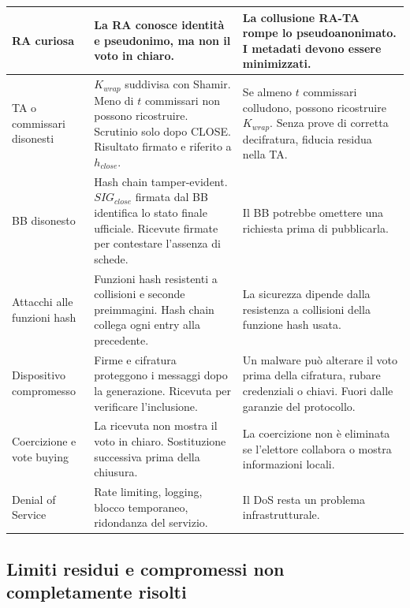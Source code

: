 \documentclass[12pt,a4paper]{article}
\begin{document}
\begin{small}
\begin{longtable}{>{\raggedright}p{2.8cm} p{4.8cm} p{5.2cm}}
RA curiosa &
La RA conosce identit\`a e pseudonimo, ma non il voto in chiaro. &
La collusione RA-TA rompe lo pseudoanonimato. I metadati devono essere minimizzati. \\
\midrule

TA o commissari disonesti &
$K_{\mathit{wrap}}$ suddivisa con Shamir. Meno di $t$ commissari non possono ricostruire. Scrutinio solo dopo CLOSE. Risultato firmato e riferito a $h_{\mathit{close}}$. &
Se almeno $t$ commissari colludono, possono ricostruire $K_{\mathit{wrap}}$. Senza prove di corretta decifratura, fiducia residua nella TA. \\
\midrule

BB disonesto &
Hash chain tamper-evident. $\mathit{SIG}_{\mathit{close}}$ firmata
dal BB identifica lo stato finale ufficiale. Ricevute firmate per
contestare l'assenza di schede. &
Il BB potrebbe omettere una richiesta prima di pubblicarla. \\
\midrule

Attacchi alle funzioni hash &
Funzioni hash resistenti a collisioni e seconde preimmagini. Hash chain collega ogni entry alla precedente. &
La sicurezza dipende dalla resistenza a collisioni della funzione hash usata. \\
\midrule

Dispositivo compromesso &
Firme e cifratura proteggono i messaggi dopo la generazione. Ricevuta per verificare l'inclusione. &
Un malware pu\`o alterare il voto prima della cifratura, rubare credenziali o chiavi. Fuori dalle garanzie del protocollo. \\
\midrule

Coercizione e vote buying &
La ricevuta non mostra il voto in chiaro. Sostituzione successiva prima della chiusura. &
La coercizione non \`e eliminata se l'elettore collabora o mostra informazioni locali. \\
\midrule

Denial of Service &
Rate limiting, logging, blocco temporaneo, ridondanza del servizio. &
Il DoS resta un problema infrastrutturale. \\
\bottomrule
\end{longtable}
\end{small}

\subsection{Limiti residui e compromessi non completamente risolti}
\end{document}
